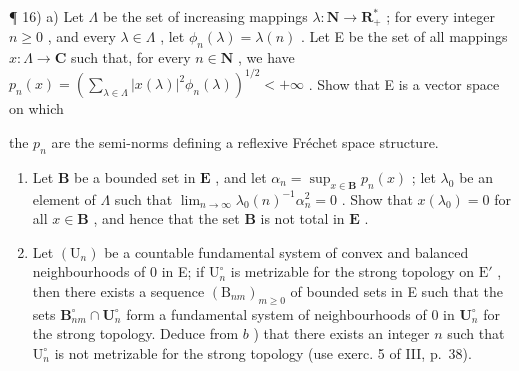 ¶ 16) a) Let \(\Lambda\) be the set of increasing mappings \(\lambda : \mathbf{N} \to \mathbf{R}_{+}^{*}\) ; for every integer \(n \geqslant 0\) , and every \(\lambda \in \Lambda\) , let \(\phi_{n}(\lambda) = \lambda(n)\) . Let E be the set of all mappings \(x: \Lambda \to \mathbf{C}\) such that, for every \(n \in \mathbf{N}\) , we have \(p_{n}(x) = \left( \sum_{\lambda \in \Lambda} |x(\lambda)|^{2} \phi_{n}(\lambda) \right)^{1/2} < +\infty\) . Show that E is a vector space on which

the \(p_{n}\) are the semi-norms defining a reflexive Fréchet space structure.

\begin{enumerate}
\def\labelenumi{\alph{enumi})}
\setcounter{enumi}{1}
\item
  Let \(\mathbf{B}\) be a bounded set in \(\mathbf{E}\) , and let \(\alpha_{n} = \sup_{x\in \mathbf{B}}p_{n}(x)\) ; let \(\lambda_0\) be an element of \(\Lambda\) such that \(\lim_{n\to \infty}\lambda_0(n)^{-1}\alpha_n^2 = 0\) . Show that \(x(\lambda_0) = 0\) for all \(x\in \mathbf{B}\) , and hence that the set \(\mathbf{B}\) is not total in \(\mathbf{E}\) .
\item
  Let \((\mathrm{U}_n)\) be a countable fundamental system of convex and balanced neighbourhoods of 0 in E; if \(\mathrm{U}_n^\circ\) is metrizable for the strong topology on \(\mathrm{E}'\) , then there exists a sequence \((\mathrm{B}_{nm})_{m\geqslant 0}\) of bounded sets in E such that the sets \(\mathbf{B}_{nm}^{\circ}\cap \mathbf{U}_n^\circ\) form a fundamental system of neighbourhoods of 0 in \(\mathbf{U}_n^\circ\) for the strong topology. Deduce from \(b\) ) that there exists an integer \(n\) such that \(\mathrm{U}_n^\circ\) is not metrizable for the strong topology (use exerc. 5 of III, p.~38).
\end{enumerate}

